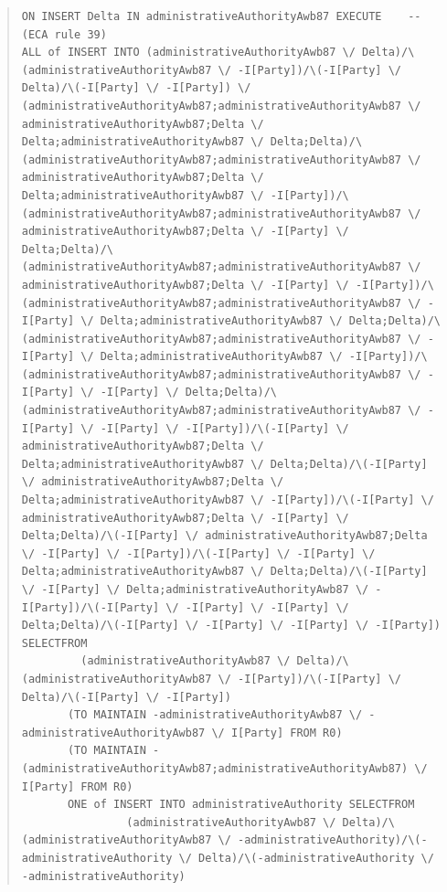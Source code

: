 \documentclass[10pt,a4paper]{report}              %
\theoremstyle{plain}\theorembodyfont{\rmfamily}\newtheorem{definition}{Definition}[section]
\theoremstyle{plain}\theorembodyfont{\rmfamily}\newtheorem{designrule}[definition]{Requirement}
\begin{document}
\begin{quote}
\begin{verbatim}
ON INSERT Delta IN administrativeAuthorityAwb87 EXECUTE    -- (ECA rule 39)
ALL of INSERT INTO (administrativeAuthorityAwb87 \/ Delta)/\(administrativeAuthorityAwb87 \/ -I[Party])/\(-I[Party] \/ Delta)/\(-I[Party] \/ -I[Party]) \/ (administrativeAuthorityAwb87;administrativeAuthorityAwb87 \/ administrativeAuthorityAwb87;Delta \/ Delta;administrativeAuthorityAwb87 \/ Delta;Delta)/\(administrativeAuthorityAwb87;administrativeAuthorityAwb87 \/ administrativeAuthorityAwb87;Delta \/ Delta;administrativeAuthorityAwb87 \/ -I[Party])/\(administrativeAuthorityAwb87;administrativeAuthorityAwb87 \/ administrativeAuthorityAwb87;Delta \/ -I[Party] \/ Delta;Delta)/\(administrativeAuthorityAwb87;administrativeAuthorityAwb87 \/ administrativeAuthorityAwb87;Delta \/ -I[Party] \/ -I[Party])/\(administrativeAuthorityAwb87;administrativeAuthorityAwb87 \/ -I[Party] \/ Delta;administrativeAuthorityAwb87 \/ Delta;Delta)/\(administrativeAuthorityAwb87;administrativeAuthorityAwb87 \/ -I[Party] \/ Delta;administrativeAuthorityAwb87 \/ -I[Party])/\(administrativeAuthorityAwb87;administrativeAuthorityAwb87 \/ -I[Party] \/ -I[Party] \/ Delta;Delta)/\(administrativeAuthorityAwb87;administrativeAuthorityAwb87 \/ -I[Party] \/ -I[Party] \/ -I[Party])/\(-I[Party] \/ administrativeAuthorityAwb87;Delta \/ Delta;administrativeAuthorityAwb87 \/ Delta;Delta)/\(-I[Party] \/ administrativeAuthorityAwb87;Delta \/ Delta;administrativeAuthorityAwb87 \/ -I[Party])/\(-I[Party] \/ administrativeAuthorityAwb87;Delta \/ -I[Party] \/ Delta;Delta)/\(-I[Party] \/ administrativeAuthorityAwb87;Delta \/ -I[Party] \/ -I[Party])/\(-I[Party] \/ -I[Party] \/ Delta;administrativeAuthorityAwb87 \/ Delta;Delta)/\(-I[Party] \/ -I[Party] \/ Delta;administrativeAuthorityAwb87 \/ -I[Party])/\(-I[Party] \/ -I[Party] \/ -I[Party] \/ Delta;Delta)/\(-I[Party] \/ -I[Party] \/ -I[Party] \/ -I[Party]) SELECTFROM
         (administrativeAuthorityAwb87 \/ Delta)/\(administrativeAuthorityAwb87 \/ -I[Party])/\(-I[Party] \/ Delta)/\(-I[Party] \/ -I[Party])
       (TO MAINTAIN -administrativeAuthorityAwb87 \/ -administrativeAuthorityAwb87 \/ I[Party] FROM R0)
       (TO MAINTAIN -(administrativeAuthorityAwb87;administrativeAuthorityAwb87) \/ I[Party] FROM R0)
       ONE of INSERT INTO administrativeAuthority SELECTFROM
                (administrativeAuthorityAwb87 \/ Delta)/\(administrativeAuthorityAwb87 \/ -administrativeAuthority)/\(-administrativeAuthority \/ Delta)/\(-administrativeAuthority \/ -administrativeAuthority)

\end{verbatim}
\end{quote}
\end{document}
